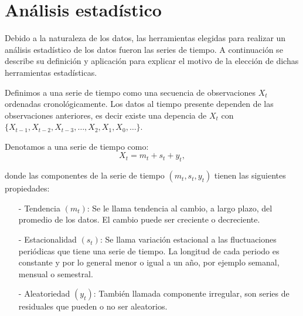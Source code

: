 \chapter{Análisis estadístico}



Debido a la naturaleza de los datos, las herramientas elegidas para realizar un análisis estadístico de los datos fueron las series de tiempo. A continuación se describe su definición y aplicación para explicar el motivo de la elección de dichas herramientas estadísticas.

Definimos a una serie de tiempo como una secuencia de observaciones $X_{t}$ ordenadas cronológicamente. Los datos al tiempo presente dependen de las observaciones anteriores, es decir existe una depencia de $X_{t}$ con $\{X_{t-1}, X_{t-2}, X_{t-3}, \ldots, X_{2}, X_{1}, X_{0}, \ldots\}$.

Denotamos a una serie de tiempo como:
  \begin{equation}
X_{t} = m_{t} + s_{t} + y_{t},
\end{equation}

donde las componentes de la serie de tiempo $(m_{t}, s_{t}, y_{t})$ tienen las siguientes propiedades:

\begin{itemize}
\item[-] Tendencia $(m_{t})$: Se le llama tendencia al cambio, a largo plazo, del promedio de los datos. El cambio puede ser creciente o decreciente.

\item[-] Estacionalidad $(s_{t})$: Se llama variación estacional a las fluctuaciones periódicas que tiene una serie de tiempo. La longitud de cada periodo es constante y por lo general menor o igual a un año, por ejemplo semanal, mensual o semestral.

\item[-] Aleatoriedad $(y_{t})$: También llamada componente irregular, son series de residuales que pueden o no ser aleatorios.
\end{itemize}


